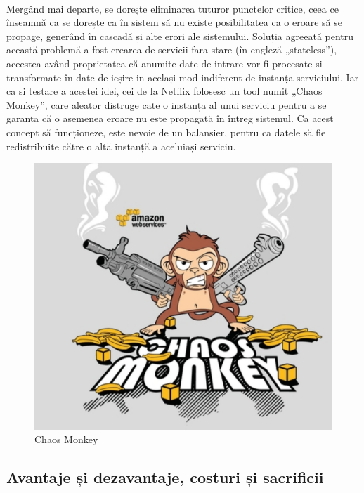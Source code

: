 \documentclass[12pt]{report}
\begin{document}
	\paragraph{}Mergând mai departe, se dorește eliminarea tuturor punctelor critice, ceea ce înseamnă ca se dorește ca în sistem să nu existe posibilitatea ca o eroare să se propage, generând în cascadă și alte erori ale sistemului. Soluția agreeată pentru această problemă a fost crearea de servicii fara stare (în engleză „stateless”), aceestea având proprietatea că anumite date de intrare vor fi procesate si transformate în date de ieșire in același mod indiferent de instanța serviciului. Iar ca si testare a acestei idei, cei de la Netflix folosesc un tool numit „Chaos Monkey”, care aleator distruge cate o instanța al unui serviciu pentru a se garanta că o asemenea eroare nu este propagată în întreg sistemul. Ca acest concept să funcționeze, este nevoie de un balansier, pentru ca datele să fie redistribuite către o altă instanță a aceluiași serviciu.
	\begin{figure}[h]
  	\centering
  	\includegraphics[scale=.5]{chaos}
	\caption{Chaos Monkey \cite{ruslan}}  
	\label{chaosMonkey}
  	\end{figure}
	\subsection{Avantaje și dezavantaje, costuri și sacrificii}
\end{document}
